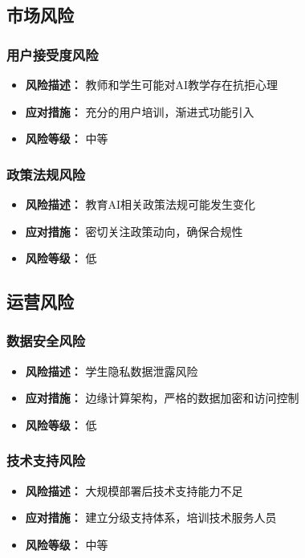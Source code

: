 \documentclass[12pt,a4paper]{article}
\begin{document}
\subsection{市场风险}

\subsubsection{用户接受度风险}
\begin{itemize}[leftmargin=2em]
    \item \textbf{风险描述：} 教师和学生可能对AI教学存在抗拒心理
    \item \textbf{应对措施：} 充分的用户培训，渐进式功能引入
    \item \textbf{风险等级：} 中等
\end{itemize}

\subsubsection{政策法规风险}
\begin{itemize}[leftmargin=2em]
    \item \textbf{风险描述：} 教育AI相关政策法规可能发生变化
    \item \textbf{应对措施：} 密切关注政策动向，确保合规性
    \item \textbf{风险等级：} 低
\end{itemize}

\subsection{运营风险}

\subsubsection{数据安全风险}
\begin{itemize}[leftmargin=2em]
    \item \textbf{风险描述：} 学生隐私数据泄露风险
    \item \textbf{应对措施：} 边缘计算架构，严格的数据加密和访问控制
    \item \textbf{风险等级：} 低
\end{itemize}

\subsubsection{技术支持风险}
\begin{itemize}[leftmargin=2em]
    \item \textbf{风险描述：} 大规模部署后技术支持能力不足
    \item \textbf{应对措施：} 建立分级支持体系，培训技术服务人员
    \item \textbf{风险等级：} 中等
\end{itemize}
\end{document}
